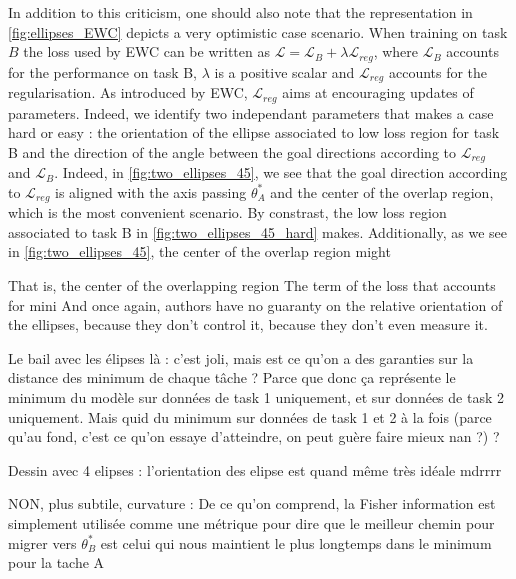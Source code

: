 \documentclass[11pt]{article}
\begin{document}
\vspace{1mm}
\noindent
In addition to this criticism, one should also note that the representation in \ref{fig:ellipses_EWC} depicts a very optimistic case scenario. When training on task $B$ the loss used by EWC can be written as $\mathcal{L} = \mathcal{L}_{B} + \lambda\mathcal{L}_{reg}$, where $\mathcal{L}_{B}$ accounts for the performance on task B, $\lambda$ is a positive scalar and $\mathcal{L}_{reg}$ accounts for the regularisation. As introduced by EWC, $\mathcal{L}_{reg}$ aims at encouraging updates of parameters. Indeed, we identify two independant parameters that makes a case hard or easy : the orientation of the ellipse associated to low loss region for task B and the direction of the angle between the goal directions according to $\mathcal{L}_{reg}$ and $\mathcal{L}_B$. Indeed, in \ref{fig:two_ellipses_45}, we see that the goal direction according to $\mathcal{L}_{reg}$ is aligned with the axis passing $\theta_A^*$ and the center of the overlap region, which is the most convenient scenario. By constrast, the low loss region associated to task B in \ref{fig:two_ellipses_45_hard} makes. Additionally, as we see in \ref{fig:two_ellipses_45}, the center of the overlap region might

That is, the center of the overlapping region
The term of the loss that accounts for mini
And once again, authors have no guaranty on the relative orientation of the ellipses, because they don't control it, because they don't even measure it.


\vspace{1mm}
\noindent
Le bail avec les élipses là : c'est joli, mais est ce qu'on a des garanties sur la distance des minimum de chaque tâche ? 
Parce que donc ça représente le minimum du modèle sur données de task 1 uniquement, et sur données de task 2 uniquement. Mais quid du minimum sur données de task 1 et 2 à la fois (parce qu'au fond, c'est ce qu'on essaye d'atteindre, on peut guère faire mieux nan ?) ?

\vspace{1mm}
\noindent
Dessin avec 4 elipses : l'orientation des elipse est quand même très idéale mdrrrr

\vspace{1mm}
\noindent
NON, plus subtile, curvature :
De ce qu'on comprend, la Fisher information est simplement utilisée comme une métrique pour dire que le meilleur chemin pour migrer vers $\theta_B^*$ est celui qui nous maintient le plus longtemps dans le minimum pour la tache A
\end{document}
